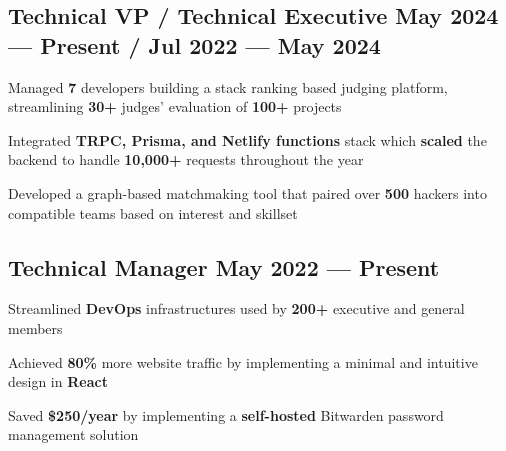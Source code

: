 \subsection{{Technical VP / Technical Executive \hfill May 2024 --- Present / Jul 2022 --- May 2024}}
\begin{zitemize}
    \item Managed \textbf{7} developers building a stack ranking based judging platform, streamlining \textbf{30+} judges' evaluation of \textbf{100+} projects
    \item Integrated \textbf{TRPC, Prisma, and Netlify functions} stack which \textbf{scaled} the backend to handle \textbf{10,000+} requests throughout the year
    \item Developed a graph-based matchmaking tool that paired over \textbf{500} hackers into compatible teams based on interest and skillset
\end{zitemize}

\vspace{0.3cm}\subsection{{Technical Manager  \hfill May 2022 --- Present}}
\begin{zitemize}
    \item Streamlined \textbf{DevOps} infrastructures used by \textbf{200+} executive and general members
    \item Achieved \textbf{80\%} more website traffic by implementing a minimal and intuitive design in \textbf{React}
    \item Saved \textbf{\$250/year} by implementing a \textbf{self-hosted} Bitwarden password management solution

\end{zitemize}